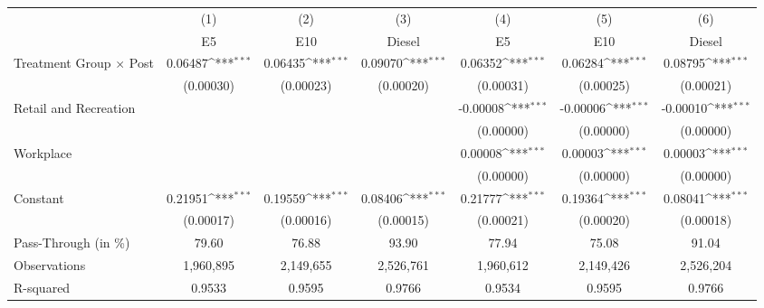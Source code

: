 {
\def\sym#1{\ifmmode^{#1}\else\(^{#1}\)\fi}
\begin{tabular}{l*{6}{c}}
\toprule
                    &\multicolumn{1}{c}{(1)}&\multicolumn{1}{c}{(2)}&\multicolumn{1}{c}{(3)}&\multicolumn{1}{c}{(4)}&\multicolumn{1}{c}{(5)}&\multicolumn{1}{c}{(6)}\\
                    &\multicolumn{1}{c}{E5}&\multicolumn{1}{c}{E10}&\multicolumn{1}{c}{Diesel}&\multicolumn{1}{c}{E5}&\multicolumn{1}{c}{E10}&\multicolumn{1}{c}{Diesel}\\
\midrule
Treatment Group $\times$ Post&     0.06487\sym{***}&     0.06435\sym{***}&     0.09070\sym{***}&     0.06352\sym{***}&     0.06284\sym{***}&     0.08795\sym{***}\\
                    &   (0.00030)         &   (0.00023)         &   (0.00020)         &   (0.00031)         &   (0.00025)         &   (0.00021)         \\
Retail and Recreation&                     &                     &                     &    -0.00008\sym{***}&    -0.00006\sym{***}&    -0.00010\sym{***}\\
                    &                     &                     &                     &   (0.00000)         &   (0.00000)         &   (0.00000)         \\
Workplace           &                     &                     &                     &     0.00008\sym{***}&     0.00003\sym{***}&     0.00003\sym{***}\\
                    &                     &                     &                     &   (0.00000)         &   (0.00000)         &   (0.00000)         \\
Constant            &     0.21951\sym{***}&     0.19559\sym{***}&     0.08406\sym{***}&     0.21777\sym{***}&     0.19364\sym{***}&     0.08041\sym{***}\\
                    &   (0.00017)         &   (0.00016)         &   (0.00015)         &   (0.00021)         &   (0.00020)         &   (0.00018)         \\
\midrule
Pass-Through (in \%)&       79.60         &       76.88         &       93.90         &       77.94         &       75.08         &       91.04         \\
Observations        &   1,960,895         &   2,149,655         &   2,526,761         &   1,960,612         &   2,149,426         &   2,526,204         \\
R-squared           &      0.9533         &      0.9595         &      0.9766         &      0.9534         &      0.9595         &      0.9766         \\
\bottomrule
\end{tabular}
}
